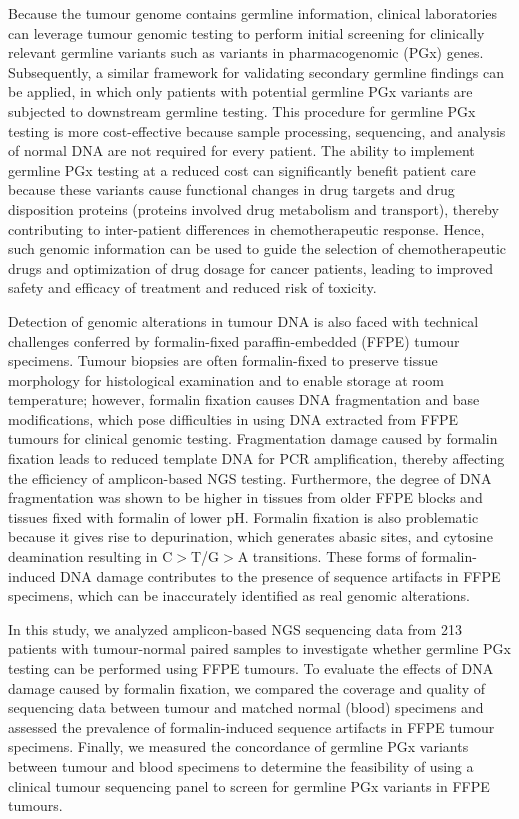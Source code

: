 \documentclass{bmcart}
\begin{document}
Because the tumour genome contains germline information, clinical laboratories can leverage tumour genomic testing to perform initial screening for clinically relevant germline variants such as variants in pharmacogenomic (PGx) genes. Subsequently, a similar framework for validating secondary germline findings can be applied, in which only patients with potential germline PGx variants are subjected to downstream germline testing. This procedure for germline PGx testing is more cost-effective because sample processing, sequencing, and analysis of normal DNA are not required for every patient. The ability to implement germline PGx testing at a reduced cost can significantly benefit patient care because these variants cause functional changes in drug targets and drug disposition proteins (proteins involved drug metabolism and transport), thereby contributing to inter-patient differences in chemotherapeutic response. Hence, such genomic information can be used to guide the selection of chemotherapeutic drugs and optimization of drug dosage for cancer patients, leading to improved safety and efficacy of treatment and reduced risk of toxicity.

Detection of genomic alterations in tumour DNA is also faced with technical challenges conferred by formalin-fixed paraffin-embedded (FFPE) tumour specimens. Tumour biopsies are often formalin-fixed to preserve tissue morphology for histological examination and to enable storage at room temperature; however, formalin fixation causes DNA fragmentation and base modifications, which pose difficulties in using DNA extracted from FFPE tumours for clinical genomic testing. Fragmentation damage caused by formalin fixation leads to reduced template DNA for PCR amplification, thereby affecting the efficiency of amplicon-based NGS testing. Furthermore, the degree of DNA fragmentation was shown to be higher in tissues from older FFPE blocks and tissues fixed with formalin of lower pH. Formalin fixation is also problematic because it gives rise to depurination, which generates abasic sites, and cytosine deamination resulting in C$>$T/G$>$A transitions. These forms of formalin-induced DNA damage contributes to the presence of sequence artifacts in FFPE specimens, which can be inaccurately identified as real genomic alterations.

In this study, we analyzed amplicon-based NGS sequencing data from 213 patients with tumour-normal paired samples to investigate whether germline PGx testing can be performed using FFPE tumours. To evaluate the effects of DNA damage caused by formalin fixation, we compared the coverage and quality of sequencing data between tumour and matched normal (blood) specimens and assessed the prevalence of formalin-induced sequence artifacts in FFPE tumour specimens. Finally, we measured the concordance of germline PGx variants between tumour and blood specimens to determine the feasibility of using a clinical tumour sequencing panel to screen for germline PGx variants in FFPE tumours.
\end{document}
